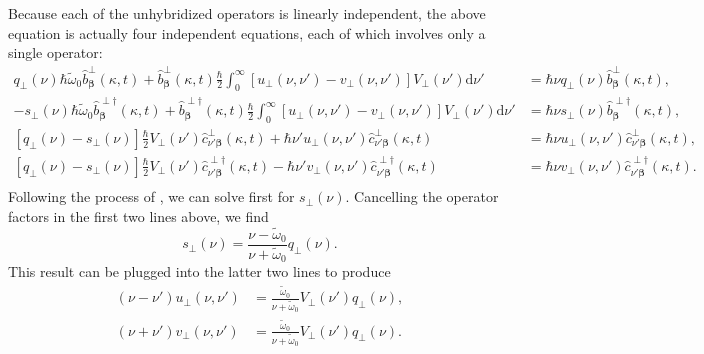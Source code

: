 \documentclass{article}
\begin{document}
Because each of the unhybridized operators is linearly independent, the above equation is actually four independent equations, each of which involves only a single operator:
\begin{equation}\label{eq:perpCoefficientsSystem}
\begin{split}
q_\perp(\nu)\hbar\tilde{\omega}_0\hat{b}_{\bm{\beta}}^\perp(\kappa,t) + \hat{b}_{\bm{\beta}}^\perp(\kappa,t)\frac{\hbar}{2}\int_0^\infty \left[u_\perp(\nu,\nu') - v_\perp(\nu,\nu')\right]V_\perp(\nu')\mathrm{d}\nu' &= \hbar\nu q_\perp(\nu)\hat{b}_{\bm{\beta}}^\perp(\kappa,t),\\
-s_\perp(\nu)\hbar\tilde{\omega}_0\hat{b}_{\bm{\beta}}^{\perp\dagger}(\kappa,t) + \hat{b}_{\bm{\beta}}^{\perp\dagger}(\kappa,t)\frac{\hbar}{2}\int_0^\infty \left[u_\perp(\nu,\nu') - v_\perp(\nu,\nu')\right]V_\perp(\nu')\mathrm{d}\nu' &= \hbar\nu s_\perp(\nu)\hat{b}_{\bm{\beta}}^{\perp\dagger}(\kappa,t),\\
\left[q_\perp(\nu) - s_\perp(\nu)\right]\frac{\hbar}{2}V_\perp(\nu')\hat{c}_{\nu'\bm{\beta}}^\perp(\kappa,t) + \hbar\nu'u_\perp(\nu,\nu')\hat{c}_{\nu'\bm{\beta}}^\perp(\kappa,t) &= \hbar\nu u_\perp(\nu,\nu')\hat{c}_{\nu'\bm{\beta}}^\perp(\kappa,t),\\
\left[q_\perp(\nu) - s_\perp(\nu)\right]\frac{\hbar}{2}V_\perp(\nu')\hat{c}_{\nu'\bm{\beta}}^{\perp\dagger}(\kappa,t) - \hbar\nu'v_\perp(\nu,\nu')\hat{c}_{\nu'\bm{\beta}}^{\perp\dagger}(\kappa,t) &= \hbar\nu v_\perp(\nu,\nu')\hat{c}_{\nu'\bm{\beta}}^{\perp\dagger}(\kappa,t).\\
\end{split}
\end{equation}
Following the process of \citet{huttner1992quantization}, we can solve first for $s_\perp(\nu)$. Cancelling the operator factors in the first two lines above, we find
\begin{equation}
s_\perp(\nu) = \frac{\nu - \tilde{\omega}_0}{\nu + \tilde{\omega}_0}q_\perp(\nu).
\end{equation}
This result can be plugged into the latter two lines to produce
\begin{equation}
\begin{split}
(\nu - \nu')u_\perp(\nu,\nu') &= \frac{\tilde{\omega}_0}{\nu + \tilde{\omega}_0}V_\perp(\nu')q_\perp(\nu),\\
(\nu + \nu')v_\perp(\nu,\nu') &= \frac{\tilde{\omega}_0}{\nu + \tilde{\omega}_0}V_\perp(\nu')q_\perp(\nu).
\end{split}
\end{equation}
\end{document}

